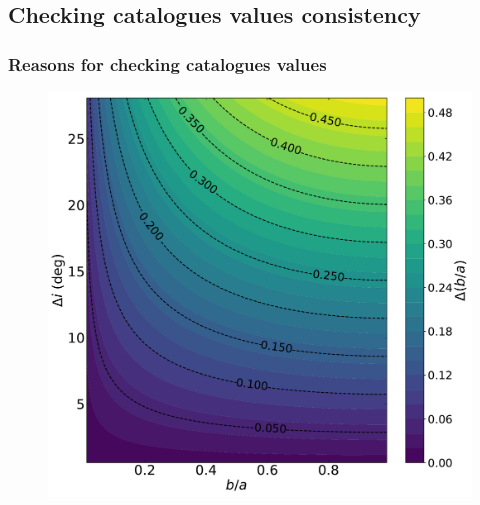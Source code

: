 \subsection{Checking catalogues values consistency}
\subsubsection{Reasons for checking catalogues values}

\begin{figure}[H]
	\centering
	\begin{minipage}[c]{0.49\linewidth}
		\includegraphics[width=\linewidth]{../Plots/Error_on_inc_versus_b_a.pdf}
	\end{minipage}
	\hfill
	\begin{minipage}[c]{0.49\linewidth}

\end{minipage}
\end{figure}
